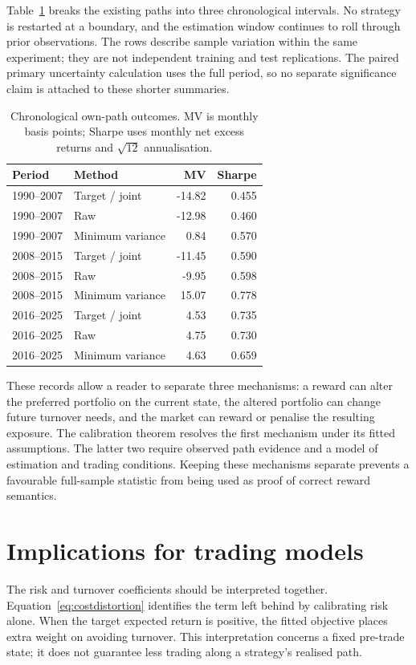 \documentclass[sigconf,review]{acmart}
\begin{document}
Table~\ref{tab:periods} breaks the existing paths into three chronological intervals. No strategy is restarted at a boundary, and the estimation window continues to roll through prior observations. The rows describe sample variation within the same experiment; they are not independent training and test replications. The paired primary uncertainty calculation uses the full period, so no separate significance claim is attached to these shorter summaries.
\begin{table}[ht]
\centering\small
\caption{Chronological own-path outcomes. MV is monthly basis points; Sharpe uses monthly net excess returns and $\sqrt{12}$ annualisation.}
\label{tab:periods}
\begin{tabular}{llrr}\toprule
Period & Method & MV & Sharpe\\\midrule
1990--2007 & Target / joint & -14.82 & 0.455 \\
1990--2007 & Raw & -12.98 & 0.460 \\
1990--2007 & Minimum variance & 0.84 & 0.570 \\
2008--2015 & Target / joint & -11.45 & 0.590 \\
2008--2015 & Raw & -9.95 & 0.598 \\
2008--2015 & Minimum variance & 15.07 & 0.778 \\
2016--2025 & Target / joint & 4.53 & 0.735 \\
2016--2025 & Raw & 4.75 & 0.730 \\
2016--2025 & Minimum variance & 4.63 & 0.659 \\
\bottomrule\end{tabular}
\end{table}
These records allow a reader to separate three mechanisms: a reward can alter the preferred portfolio on the current state, the altered portfolio can change future turnover needs, and the market can reward or penalise the resulting exposure. The calibration theorem resolves the first mechanism under its fitted assumptions. The latter two require observed path evidence and a model of estimation and trading conditions. Keeping these mechanisms separate prevents a favourable full-sample statistic from being used as proof of correct reward semantics.

\section{Implications for trading models}
The risk and turnover coefficients should be interpreted together. Equation~\eqref{eq:costdistortion} identifies the term left behind by calibrating risk alone. When the target expected return is positive, the fitted objective places extra weight on avoiding turnover. This interpretation concerns a fixed pre-trade state; it does not guarantee less trading along a strategy's realised path.
\end{document}

